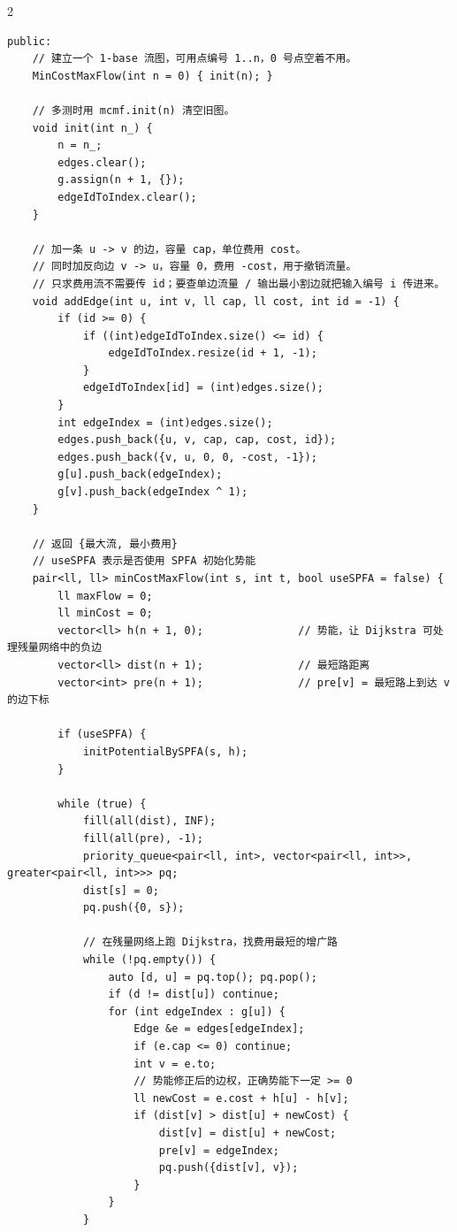 \begin{multicols*}{2}
\begin{verbatim}
public:
    // 建立一个 1-base 流图，可用点编号 1..n，0 号点空着不用。
    MinCostMaxFlow(int n = 0) { init(n); }

    // 多测时用 mcmf.init(n) 清空旧图。
    void init(int n_) {
        n = n_;
        edges.clear();
        g.assign(n + 1, {});
        edgeIdToIndex.clear();
    }

    // 加一条 u -> v 的边，容量 cap，单位费用 cost。
    // 同时加反向边 v -> u，容量 0，费用 -cost，用于撤销流量。
    // 只求费用流不需要传 id；要查单边流量 / 输出最小割边就把输入编号 i 传进来。
    void addEdge(int u, int v, ll cap, ll cost, int id = -1) {
        if (id >= 0) {
            if ((int)edgeIdToIndex.size() <= id) {
                edgeIdToIndex.resize(id + 1, -1);
            }
            edgeIdToIndex[id] = (int)edges.size();
        }
        int edgeIndex = (int)edges.size();
        edges.push_back({u, v, cap, cap, cost, id});
        edges.push_back({v, u, 0, 0, -cost, -1});
        g[u].push_back(edgeIndex);
        g[v].push_back(edgeIndex ^ 1);
    }

    // 返回 {最大流, 最小费用}
    // useSPFA 表示是否使用 SPFA 初始化势能
    pair<ll, ll> minCostMaxFlow(int s, int t, bool useSPFA = false) {
        ll maxFlow = 0;
        ll minCost = 0;
        vector<ll> h(n + 1, 0);               // 势能，让 Dijkstra 可处理残量网络中的负边
        vector<ll> dist(n + 1);               // 最短路距离
        vector<int> pre(n + 1);               // pre[v] = 最短路上到达 v 的边下标

        if (useSPFA) {
            initPotentialBySPFA(s, h);
        }

        while (true) {
            fill(all(dist), INF);
            fill(all(pre), -1);
            priority_queue<pair<ll, int>, vector<pair<ll, int>>, greater<pair<ll, int>>> pq;
            dist[s] = 0;
            pq.push({0, s});

            // 在残量网络上跑 Dijkstra，找费用最短的增广路
            while (!pq.empty()) {
                auto [d, u] = pq.top(); pq.pop();
                if (d != dist[u]) continue;
                for (int edgeIndex : g[u]) {
                    Edge &e = edges[edgeIndex];
                    if (e.cap <= 0) continue;
                    int v = e.to;
                    // 势能修正后的边权，正确势能下一定 >= 0
                    ll newCost = e.cost + h[u] - h[v];
                    if (dist[v] > dist[u] + newCost) {
                        dist[v] = dist[u] + newCost;
                        pre[v] = edgeIndex;
                        pq.push({dist[v], v});
                    }
                }
            }


\end{verbatim}
\end{multicols*}
